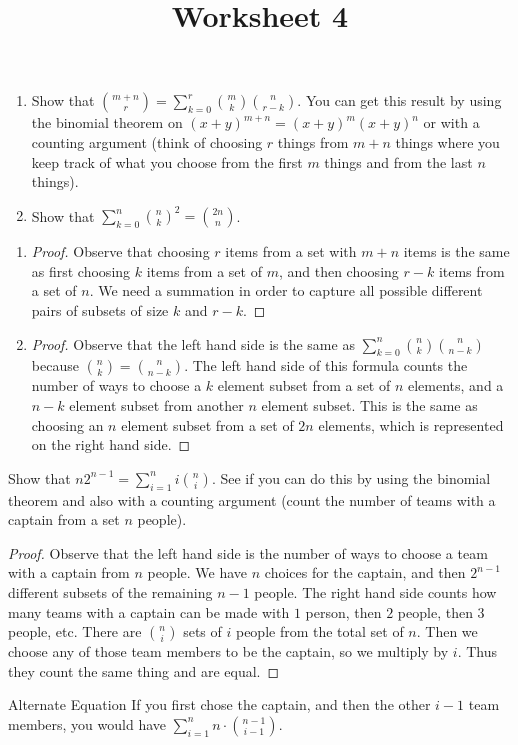 \documentclass{article}
\title{Worksheet 4}
\begin{document}
  \maketitle
  \newpage
  \begin{problem}{1}
    \begin{enumerate}[label=(\alph*)]
      \item Show that $\binom{m+n}{r} = \sum_{k=0}^r \binom{m}{k}\binom{n}{r-k}$. You can get this result by using the binomial theorem on $(x+y)^{m+n}=(x+y)^m(x+y)^n$ or with a counting argument (think of choosing $r$ things from $m+n$ things where you keep track of what you choose from the first $m$ things and from the last $n$ things).
      \item Show that $\sum_{k=0}^n \binom{n}{k}^2 = \binom{2n}{n}$.
    \end{enumerate}
  \end{problem}
  \begin{enumerate}[label=(\alph*)]
    \item 
    \begin{proof}
      Observe that choosing $r$ items from a set with $m+n$ items is the same as first choosing $k$ items from a set of $m$, and then choosing $r-k$ items from a set of $n$. We need a summation in order to capture all possible different pairs of subsets of size $k$ and $r-k$.
    \end{proof}
    \item 
    \begin{proof}
      Observe that the left hand side is the same as $\sum_{k=0}^n \binom{n}{k}\binom{n}{n-k}$ because $\binom{n}{k} = \binom{n}{n-k}$. The left hand side of this formula counts the number of ways to choose a $k$ element subset from a set of $n$ elements, and a $n-k$ element subset from another $n$ element subset. This is the same as choosing an $n$ element subset from a set of $2n$ elements, which is represented on the right hand side.
    \end{proof}
  \end{enumerate}
  \newpage
  \begin{problem}{2}
    Show that $n 2^{n-1} = \sum_{i=1}^{n}i \binom{n}{i}$. See if you can do this by using the binomial theorem and also with a counting argument (count the number of teams with a captain from a set $n$ people).
  \end{problem}
  \begin{proof}
    Observe that the left hand side is the number of ways to choose a team with a captain from $n$ people. We have $n$ choices for the captain, and then $2^{n-1}$ different subsets of the remaining $n-1$ people. The right hand side counts how many teams with a captain can be made with $1$ person, then $2$ people, then $3$ people, etc. There are $\binom{n}{i}$ sets of $i$ people from the total set of $n$. Then we choose any of those team members to be the captain, so we multiply by $i$. Thus they count the same thing and are equal.
  \end{proof}
  \begin{note}{Alternate Equation}
    If you first chose the captain, and then the other $i-1$ team members, you would have $\sum_{i=1}^{n}n\cdot \binom{n-1}{i-1}$.
  \end{note}
\end{document}

